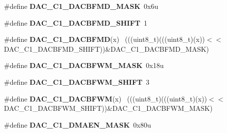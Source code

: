 \begin{DoxyCompactItemize}
\item 
\hypertarget{group___d_a_c___register___masks_ga28373e4d9ae322da4f6a37933a340b78}{}\#define {\bfseries D\+A\+C\+\_\+\+C1\+\_\+\+D\+A\+C\+B\+F\+M\+D\+\_\+\+M\+A\+S\+K}~0x6u\label{group___d_a_c___register___masks_ga28373e4d9ae322da4f6a37933a340b78}

\item 
\hypertarget{group___d_a_c___register___masks_ga779629844ed0967b310e7f2721c54624}{}\#define {\bfseries D\+A\+C\+\_\+\+C1\+\_\+\+D\+A\+C\+B\+F\+M\+D\+\_\+\+S\+H\+I\+F\+T}~1\label{group___d_a_c___register___masks_ga779629844ed0967b310e7f2721c54624}

\item 
\hypertarget{group___d_a_c___register___masks_gaacd61446351eecf90f0c04eed83ef08f}{}\#define {\bfseries D\+A\+C\+\_\+\+C1\+\_\+\+D\+A\+C\+B\+F\+M\+D}(x)                                            ~(((uint8\+\_\+t)(((uint8\+\_\+t)(x))$<$$<$D\+A\+C\+\_\+\+C1\+\_\+\+D\+A\+C\+B\+F\+M\+D\+\_\+\+S\+H\+I\+F\+T))\&D\+A\+C\+\_\+\+C1\+\_\+\+D\+A\+C\+B\+F\+M\+D\+\_\+\+M\+A\+S\+K)\label{group___d_a_c___register___masks_gaacd61446351eecf90f0c04eed83ef08f}

\item 
\hypertarget{group___d_a_c___register___masks_gaad89dbfc60735cf12eb6cfff9157fffa}{}\#define {\bfseries D\+A\+C\+\_\+\+C1\+\_\+\+D\+A\+C\+B\+F\+W\+M\+\_\+\+M\+A\+S\+K}~0x18u\label{group___d_a_c___register___masks_gaad89dbfc60735cf12eb6cfff9157fffa}

\item 
\hypertarget{group___d_a_c___register___masks_gacc4542331c55b93fe589d439a69122f7}{}\#define {\bfseries D\+A\+C\+\_\+\+C1\+\_\+\+D\+A\+C\+B\+F\+W\+M\+\_\+\+S\+H\+I\+F\+T}~3\label{group___d_a_c___register___masks_gacc4542331c55b93fe589d439a69122f7}

\item 
\hypertarget{group___d_a_c___register___masks_ga4a605c96af86b2bcbb448a075e1fb76e}{}\#define {\bfseries D\+A\+C\+\_\+\+C1\+\_\+\+D\+A\+C\+B\+F\+W\+M}(x)                                            ~(((uint8\+\_\+t)(((uint8\+\_\+t)(x))$<$$<$D\+A\+C\+\_\+\+C1\+\_\+\+D\+A\+C\+B\+F\+W\+M\+\_\+\+S\+H\+I\+F\+T))\&D\+A\+C\+\_\+\+C1\+\_\+\+D\+A\+C\+B\+F\+W\+M\+\_\+\+M\+A\+S\+K)\label{group___d_a_c___register___masks_ga4a605c96af86b2bcbb448a075e1fb76e}

\item 
\hypertarget{group___d_a_c___register___masks_ga091be41dfd851b71978ab7298c372292}{}\#define {\bfseries D\+A\+C\+\_\+\+C1\+\_\+\+D\+M\+A\+E\+N\+\_\+\+M\+A\+S\+K}~0x80u\label{group___d_a_c___register___masks_ga091be41dfd851b71978ab7298c372292}


\end{DoxyCompactItemize}
